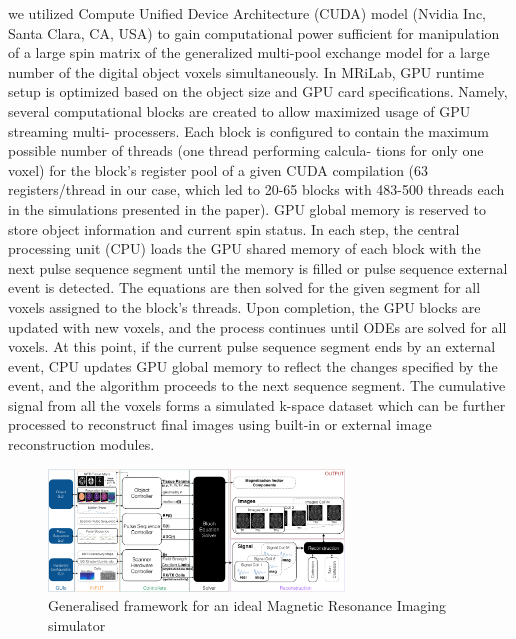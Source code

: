 we utilized Compute Unified Device Architecture (CUDA) model (Nvidia Inc, Santa Clara, CA, USA) to gain computational power sufficient for manipulation of a large spin matrix of the generalized multi-pool exchange model for a large number of the digital object voxels simultaneously. In MRiLab, GPU runtime setup is optimized based on the object size and GPU card specifications. Namely, several computational blocks are created to allow maximized usage of GPU streaming multi- processers. Each block is configured to contain the maximum possible number of threads (one thread performing calcula- tions for only one voxel) for the block’s register pool of a given CUDA compilation (63 registers/thread in our case, which led to 20-65 blocks with 483-500 threads each in the simulations presented in the paper). GPU global memory is reserved to store object information and current spin status. In each step, the central processing unit (CPU) loads the GPU shared memory of each block with the next pulse sequence segment until the memory is filled or pulse sequence external event is detected. The equations are then solved for the given segment for all voxels assigned to the block’s threads. Upon completion, the GPU blocks are updated with new voxels, and the process continues until ODEs are solved for all voxels. At this point, if the current pulse sequence segment ends by an external event, CPU updates GPU global memory to reflect the changes specified by the event, and the algorithm proceeds to the next sequence segment. The cumulative signal from all the voxels forms a simulated k-space dataset which can be further processed to reconstruct final images using built-in or external image reconstruction modules.




\hfill


\begin{figure}[ht]
    \centering
    \includegraphics[angle=90,width=0.7\textwidth, keepaspectratio]{images/mri/globalFramework}
    \caption{Generalised framework for an ideal Magnetic Resonance Imaging simulator}
    \label{fig:globalFramework}
\end{figure}
